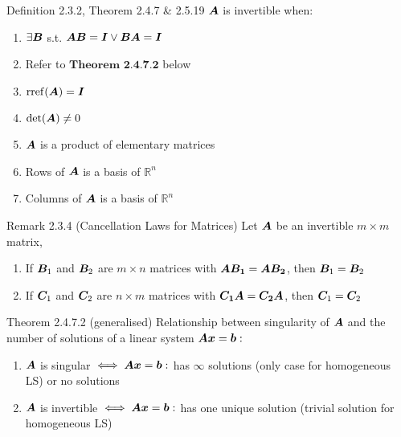 \documentclass[11pt,landscape]{article}
\begin{document}
\begin{multicols}{2}
\begin{justifying}
\begin{namedthm*}{Definition 2.3.2, Theorem 2.4.7 \& 2.5.19} %
	\(\bm{A}\) is invertible when:
	\begin{enumerate}
		\item \(\exists \bm{B}\) s.t. \(\bm{AB} = \bm{I} \lor \bm{BA} = \bm{I}\)
		\item Refer to \(\textbf{Theorem 2.4.7.2}\) below
		\item \(\operatorname{rref}(\bm{A}) = \bm{I}\)
		\item \(\det(\bm{A}) \ne 0\)
		\item \(\bm{A}\) is a product of elementary matrices
		\item Rows of \(\bm{A}\) is a basis of \(\mathbb{R}^n\)
		\item Columns of \(\bm{A}\) is a basis of \(\mathbb{R}^n\)
	\end{enumerate} 
\end{namedthm*}

\begin{namedthm*}{Remark 2.3.4 (Cancellation Laws for Matrices)}
	Let \(\bm{A}\) be an invertible \(m \times m\) matrix,
	\begin{enumerate}[label=(\alph*)]
		\item If \(\bm{B}_1\) and \(\bm{B}_2\) are \(m \times n\) matrices with \(\bm{AB_1} = \bm{AB_2}\), then \(\bm{B}_1 = \bm{B}_2\)
		\item If \(\bm{C}_1\) and \(\bm{C}_2\) are \(n \times m\) matrices with \(\bm{C_1A} = \bm{C_2A}\), then \(\bm{C}_1 = \bm{C}_2\)
	\end{enumerate}
\end{namedthm*}
\begin{namedthm*}{Theorem 2.4.7.2 (generalised)}
	Relationship between singularity of \(\bm{A}\) and the number of solutions of a linear system \(\bm{Ax} = \bm{b}:\)
	\begin{enumerate}
		\item \(\bm{A}\) is singular \(\iff \bm{Ax} = \bm{b}:\) has $\infty$ solutions (only case for homogeneous LS) or no solutions
		\item \(\bm{A}\) is invertible \(\iff \bm{Ax} = \bm{b}:\) has one unique solution (trivial solution for homogeneous LS)
	\end{enumerate} 
\end{namedthm*}


\end{justifying}
\end{multicols}
\end{document}
